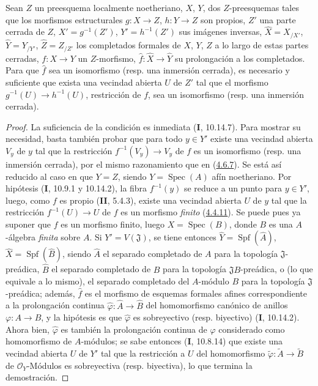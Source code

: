 \begin{proposition}[4.6.8]
\label{III.4.6.8-fr}
Sean $Z$ un preesquema localmente noetheriano, $X$, $Y$, dos $Z$-preesquemas
tales que los morfismos estructurales $g:X\to Z$, $h:Y\to Z$ son propios,
$Z'$ una parte cerrada de $Z$, $X'=g^{-1}(Z')$, $Y'=h^{-1}(Z')$ sus imágenes
inversas,
$\widehat X=X_{/X'}$, $\widehat Y=Y_{/Y'}$, $\widehat Z=Z_{/Z'}$
los completados formales de $X$, $Y$, $Z$ a lo largo de estas partes cerradas,
$f:X\to Y$ un $Z$-morfismo, $\widehat f:\widehat X\to\widehat Y$ su
prolongación a los completados. Para que $\widehat f$ sea un isomorfismo (\textup{resp.}
una inmersión cerrada), es necesario y suficiente que exista una vecindad abierta
$U$ de $Z'$ tal que el morfismo $g^{-1}(U)\to h^{-1}(U)$, restricción de
$f$, sea un isomorfismo (\textup{resp.} una inmersión cerrada).
\end{proposition}

\begin{proof}
La suficiencia de la condición es inmediata (\textbf{I}, 10.14.7). Para mostrar su
necesidad, basta también probar que para todo $y\in Y'$ existe una
vecindad abierta $V_y$ de $y$ tal que la restricción
$f^{-1}(V_y)\to V_y$ de $f$ es un isomorfismo (resp. una inmersión
cerrada), por el mismo razonamiento que en
(\hyperref[III.4.6.7-fr]{4.6.7}). Se está así reducido al caso en que $Y=Z$,
siendo $Y=\operatorname{Spec}(A)$ afín noetheriano. Por hipótesis
(\textbf{I}, 10.9.1 y 10.14.2), la fibra $f^{-1}(y)$ se reduce a un punto para
$y\in Y'$, luego, como $f$ es propio (\textbf{II}, 5.4.3), existe una vecindad
abierta $U$ de $y$ tal que la restricción $f^{-1}(U)\to U$ de $f$ es un
morfismo \emph{finito} (\hyperref[III.4.4.11-fr]{4.4.11}). Se puede pues ya suponer
que $f$ es un morfismo finito, luego $X=\operatorname{Spec}(B)$, donde $B$ es
una $A$-álgebra \emph{finita} sobre $A$. Si $Y'=V(\mathfrak J)$, se tiene entonces
$\widehat Y=\operatorname{Spf}(\widehat A)$, $\widehat X=\operatorname{Spf}(\widehat B)$,
siendo $\widehat A$ el separado completado de $A$ para la topología
$\mathfrak J$-preádica, $\widehat B$ el separado completado de $B$ para la
topología $\mathfrak JB$-preádica, o (lo que equivale a lo mismo), el separado
completado del $A$-módulo $B$ para la topología $\mathfrak J$-preádica;
además, $\widehat f$ es el morfismo de esquemas formales afines correspondiente
a la prolongación continua $\widehat\varphi:\widehat A\to\widehat B$ del
homomorfismo canónico de anillos $\varphi:A\to B$, y la hipótesis es que
$\widehat\varphi$ es sobreyectivo (resp. biyectivo) (\textbf{I}, 10.14.2). Ahora bien,
$\widehat\varphi$ es también la prolongación continua de $\varphi$ considerado
como homomorfismo de $A$-módulos; se sabe entonces (\textbf{I}, 10.8.14) que existe
una vecindad abierta $U$ de $Y'$ tal que la restricción a $U$ del
homomorfismo $\widetilde\varphi:\widetilde A\to\widetilde B$ de
$\mathcal O_Y$-Módulos es sobreyectiva (resp. biyectiva), lo que termina la
demostración.
\end{proof}

